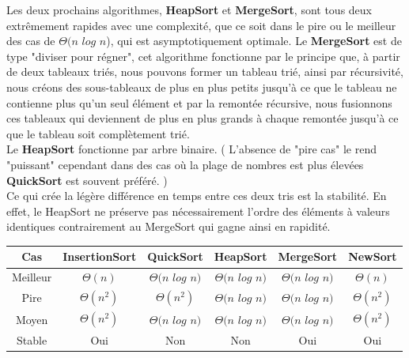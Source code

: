 \documentclass[a4paper, 11pt, oneside]{article}
\begin{document}
Les deux prochains algorithmes, \textbf{HeapSort} et \textbf{MergeSort}, sont tous deux extrêmement rapides avec une complexité, que ce soit dans le pire ou le meilleur des cas de $\Theta(n$ $log$ $n$),  qui est asymptotiquement optimale. Le \textbf{MergeSort} est de type "diviser pour régner", cet algorithme fonctionne par le principe que, à partir de deux tableaux triés, nous pouvons former un tableau trié, ainsi par récursivité, nous créons des sous-tableaux de plus en plus petits jusqu'à ce que le tableau ne contienne plus qu'un seul élément et par la remontée récursive, nous fusionnons ces tableaux qui deviennent de plus en plus grands à chaque remontée jusqu'à ce que le tableau soit complètement trié.\\ Le \textbf{HeapSort} fonctionne par arbre binaire. ( L'absence de "pire cas" le rend "puissant" cependant dans des cas où la plage de nombres est plus élevées \textbf{QuickSort} est souvent préféré. ) \\
Ce qui crée la légère différence en temps entre ces deux tris est la stabilité. En effet, le HeapSort ne préserve pas nécessairement l’ordre des éléments à valeurs identiques contrairement au MergeSort qui gagne ainsi en rapidité.

\begin{table}[htb]
\begin{tabular}{cccccc}
\hline

Cas   & InsertionSort & QuickSort & HeapSort & MergeSort & NewSort \\ \hline
Meilleur & $\Theta(n)$      & $\Theta(n$ $log$ $n)$   & $\Theta(n$ $log$ $n)$        & $\Theta(n$ $log$ $n)$          & $\Theta(n)$        \\
Pire & $\Theta(n^{2})$     & $\Theta(n^{2})$  & $\Theta(n$ $log$ $n)$         & $\Theta(n$ $log$ $n)$ & $\Theta(n^{2})$       \\
Moyen & $\Theta(n^{2})$      & $\Theta(n$ $log$ $n)$  & $\Theta(n$ $log$ $n)$         & $\Theta(n$ $log$ $n)$         & $\Theta(n^{2})$        \\
Stable & Oui      & Non  & Non         & Oui          & Oui        \\
  
\end{tabular}
\end{table}
\end{document}
